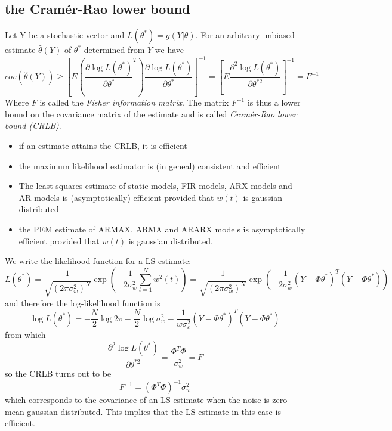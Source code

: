 \documentclass{book}
\theoremstyle{definition}
\theoremstyle{remark}
\theoremstyle{remark}
\begin{document}
\subsection{the Cramér-Rao lower bound}
Let Y be a stochastic vector and $L(\theta^*)=g(Y|\theta)$. For an arbitrary unbiased estimate $\hat{\theta}(Y)$ of $\theta^*$ determined from $Y$ we have 
\[
    cov (\hat{\theta}(Y))\geq \left[E\left(\displaystyle\frac{\partial \log L(\theta^*)}{\partial \theta^*}^T  \right)\displaystyle\frac{\partial \log L(\theta^*)}{\partial \theta^*} \right]^{-1} = \left[E\displaystyle\frac{\partial^2\log L(\theta^*) }{\partial \theta^{*2}}\right]^{-1}=F^{-1}
\]
Where $F$ is called the \emph{Fisher information matrix}. The matrix $F^{-1}$ is thus a lower bound on the covariance matrix of the estimate and is called \emph{Cramér-Rao lower bound (CRLB)}. 
\begin{itemize}
    \item if an estimate attains the CRLB, it is efficient
    \item the maximum likelihood estimator is (in geneal) consistent and efficient 
    \item The least squares estimate of static models, FIR models, ARX models and AR models is (asymptotically) efficient provided that $w(t)$ is gaussian distributed 
    \item the PEM estimate of ARMAX, ARMA and ARARX models is asymptotically efficient provided that $w(t)$ is gaussian distributed.
\end{itemize}
We write the likelihood function for a LS estimate:
\[
    L(\theta^*)=\displaystyle\frac{1}{\sqrt{(2\pi\sigma_w^2)^N}}\exp\left(-\displaystyle\frac{1}{2\sigma_w^2}\displaystyle\sum_{t=1}^{N}w^2(t)\right)=\displaystyle\frac{1}{\sqrt{(2\pi\sigma_w^2)^N}}\exp\left(-\displaystyle\frac{1}{2\sigma_w^2}(Y-\Phi\theta^*)^T(Y-\Phi\theta^*)\right)
\]
and therefore the log-likelihood function is 
\[
    \log L(\theta^*) = -\displaystyle\frac{N}{2}\log 2\pi- \displaystyle\frac{N}{2}\log \sigma_w^2 - \displaystyle\frac{1}{w\sigma_\varepsilon^2}(Y-\Phi\theta^*)^T(Y-\Phi\theta^*)
\]
from which
\[
    \displaystyle\frac{\partial^2 \log L(\theta^*)}{\partial\theta^{*2}} = \displaystyle\frac{\Phi^T\Phi}{\sigma_w^2}=F
\]
so the CRLB turns out to be 
\[
    F^{-1}=(\Phi^T\Phi)^{-1}\sigma_w^2
\]
which corresponds to the covariance of an LS estimate when the noise is zero-mean gaussian distributed. This implies that the LS estimate in this case is efficient.
\end{document}
